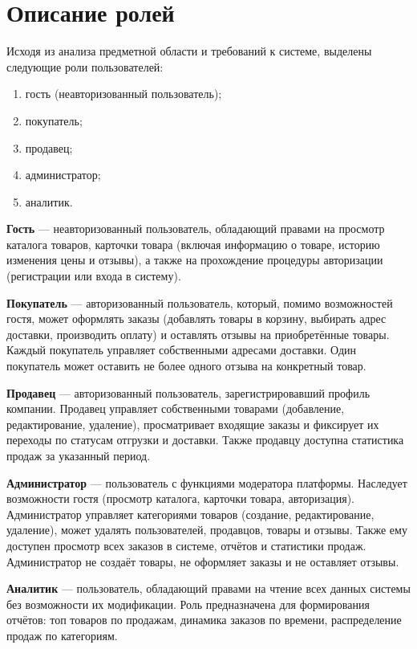 
\section{Описание ролей}

Исходя из анализа предметной области и требований к системе, выделены следующие роли пользователей:

\begin{enumerate}
    \item гость (неавторизованный пользователь);
    \item покупатель;
    \item продавец;
    \item администратор;
    \item аналитик.
\end{enumerate}

\textbf{Гость} --- неавторизованный пользователь, обладающий правами на просмотр каталога товаров, карточки товара (включая информацию о товаре, историю изменения цены и отзывы), а также на прохождение процедуры авторизации (регистрации или входа в систему).

\textbf{Покупатель} --- авторизованный пользователь, который, помимо возможностей гостя, может оформлять заказы (добавлять товары в корзину, выбирать адрес доставки, производить оплату) и оставлять отзывы на приобретённые товары. Каждый покупатель управляет собственными адресами доставки. Один покупатель может оставить не более одного отзыва на конкретный товар.

\textbf{Продавец} --- авторизованный пользователь, зарегистрировавший профиль компании. Продавец управляет собственными товарами (добавление, редактирование, удаление), просматривает входящие заказы и фиксирует их переходы по статусам отгрузки и доставки. Также продавцу доступна статистика продаж за указанный период.

\textbf{Администратор} --- пользователь с функциями модератора платформы. Наследует возможности гостя (просмотр каталога, карточки товара, авторизация). Администратор управляет категориями товаров (создание, редактирование, удаление), может удалять пользователей, продавцов, товары и отзывы. Также ему доступен просмотр всех заказов в системе, отчётов и статистики продаж. Администратор не создаёт товары, не оформляет заказы и не оставляет отзывы.

\textbf{Аналитик} --- пользователь, обладающий правами на чтение всех данных системы без возможности их модификации. Роль предназначена для формирования отчётов: топ товаров по продажам, динамика заказов по времени, распределение продаж по категориям.

